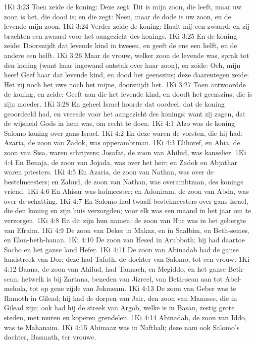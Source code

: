 1Ki 3:23  Toen zeide de koning: Deze zegt: Dit is mijn zoon, die leeft, maar uw zoon is het, die dood is; en die zegt: Neen, maar de dode is uw zoon, en de levende mijn zoon.
1Ki 3:24  Verder zeide de koning: Haalt mij een zwaard; en zij brachten een zwaard voor het aangezicht des konings.
1Ki 3:25  En de koning zeide: Doorsnijdt dat levende kind in tweeen, en geeft de ene een helft, en de andere een helft.
1Ki 3:26  Maar de vrouw, welker zoon de levende was, sprak tot den koning (want haar ingewand ontstak over haar zoon), en zeide: Och, mijn heer! Geef haar dat levende kind, en dood het geenszins; deze daarentegen zeide: Het zij noch het uwe noch het mijne, doorsnijdt het.
1Ki 3:27  Toen antwoordde de koning, en zeide: Geeft aan die het levende kind, en doodt het geenszins; die is zijn moeder.
1Ki 3:28  En geheel Israel hoorde dat oordeel, dat de koning geoordeeld had, en vreesde voor het aangezicht des konings; want zij zagen, dat de wijsheid Gods in hem was, om recht te doen.
1Ki 4:1  Alzo was de koning Salomo koning over gans Israel.
1Ki 4:2  En deze waren de vorsten, die hij had: Azaria, de zoon van Zadok, was opperambtman.
1Ki 4:3  Elihoref, en Ahia, de zoon van Sisa, waren schrijvers; Josafat, de zoon van Ahilud, was kanselier.
1Ki 4:4  En Benaja, de zoon van Jojada, was over het heir; en Zadok en Abjathar waren priesters.
1Ki 4:5  En Azaria, de zoon van Nathan, was over de bestelmeesters; en Zabud, de zoon van Nathan, was overambtman, des konings vriend.
1Ki 4:6  En Ahisar was hofmeester; en Adoniram, de zoon van Abda, was over de schatting.
1Ki 4:7  En Salomo had twaalf bestelmeesters over gans Israel, die den koning en zijn huis verzorgden; voor elk was een maand in het jaar om te verzorgen.
1Ki 4:8  En dit zijn hun namen: de zoon van Hur was in het gebergte van Efraim.
1Ki 4:9  De zoon van Deker in Makaz, en in Saalbim, en Beth-semes, en Elon-beth-hanan.
1Ki 4:10  De zoon van Hesed in Arubboth; hij had daartoe Socho en het ganse land Hefer.
1Ki 4:11  De zoon van Abinadab had de ganse landstreek van Dor; deze had Tafath, de dochter van Salomo, tot een vrouw.
1Ki 4:12  Baana, de zoon van Ahilud, had Taanach, en Megiddo, en het ganse Beth-sean, hetwelk is bij Zartana, beneden van Jizreel, van Beth-sean aan tot Abel-mehola, tot op gene zijde van Jokmeam.
1Ki 4:13  De zoon van Geber was te Ramoth in Gilead; hij had de dorpen van Jair, den zoon van Manasse, die in Gilead zijn; ook had hij de streek van Argob, welke is in Basan, zestig grote steden, met muren en koperen grendelen.
1Ki 4:14  Abinadab, de zoon van Iddo, was te Mahanaim.
1Ki 4:15  Ahimaaz was in Nafthali; deze nam ook Salomo's dochter, Basmath, ter vrouwe.
